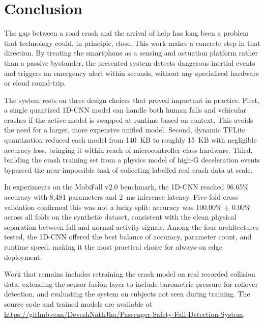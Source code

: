 \documentclass[journal]{IEEEtran}
\begin{document}
\section{Conclusion}
\label{sec:conclusion}

The gap between a road crash and the arrival of help has long been a problem
that technology could, in principle, close. This work makes a concrete step in
that direction. By treating the smartphone as a sensing and actuation platform
rather than a passive bystander, the presented system detects dangerous inertial
events and triggers an emergency alert within seconds, without any specialised
hardware or cloud round-trip.

The system rests on three design choices that proved important in practice.
First, a single quantized 1D-CNN model can handle both human falls and vehicular
crashes if the active model is swapped at runtime based on context. This avoids
the need for a larger, more expensive unified model. Second, dynamic
TFLite quantization reduced each model from 140~KB to roughly 15~KB with
negligible accuracy loss, bringing it within reach of microcontroller-class
hardware. Third, building the crash training set from a physics model of
high-G deceleration events bypassed the near-impossible task of collecting
labelled real crash data at scale.

In experiments on the MobiFall v2.0 benchmark, the 1D-CNN reached 96.65\%
accuracy with 8,481 parameters and 2~ms inference latency. Five-fold
cross-validation confirmed this was not a lucky split: accuracy was
100.00\% $\pm$ 0.00\% across all folds on the synthetic dataset, consistent
with the clean physical separation between fall and normal activity signals.
Among the four architectures tested, the 1D-CNN offered the best balance of
accuracy, parameter count, and runtime speed, making it the most practical
choice for always-on edge deployment.

Work that remains includes retraining the crash model on real recorded
collision data, extending the sensor fusion layer to include barometric pressure
for rollover detection, and evaluating the system on subjects not seen during
training. The source code and trained models are available at
\url{https://github.com/DeveshNathJha/Passenger-Safety-Fall-Detection-System}.


\end{document}
